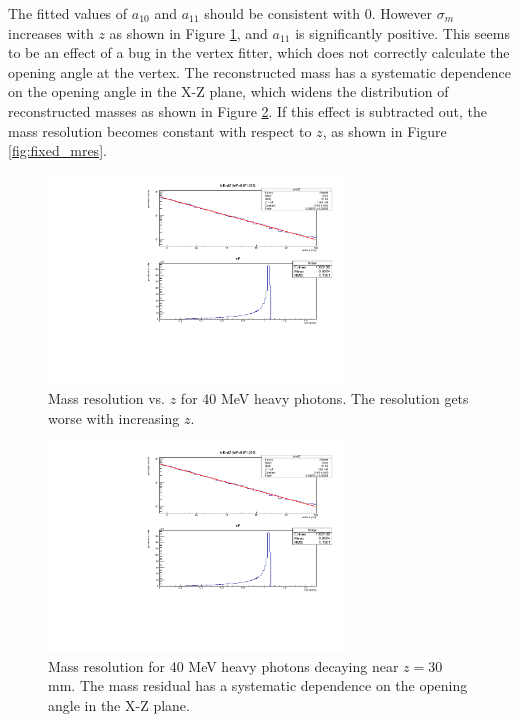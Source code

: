 The fitted values of $a_{10}$ and $a_{11}$ should be consistent with 0.
However $\sigma_m$ increases with $z$ as shown in Figure \ref{fig:skewed_mres}, and $a_{11}$ is significantly positive.
This seems to be an effect of a bug in the vertex fitter, which does not correctly calculate the opening angle at the vertex.
The reconstructed mass has a systematic dependence on the opening angle in the X-Z plane, which widens the distribution of reconstructed masses as shown in Figure \ref{fig:mass_skew}.
If this effect is subtracted out, the mass resolution becomes constant with respect to $z$, as shown in Figure \ref{fig:fixed_mres}.

\begin{figure}[ht]
\begin{center}
    \includegraphics[width=0.7\textwidth,page=4,angle=-90]{vertexing/figs/acceptance_40}
\end{center}
    \caption{Mass resolution vs. $z$ for 40 MeV heavy photons. The resolution gets worse with increasing $z$.}
    \label{fig:skewed_mres}
\end{figure}

\begin{figure}[ht]
\begin{center}
    \includegraphics[width=0.7\textwidth,page=5,angle=-90]{vertexing/figs/acceptance_40}
\end{center}
    \caption{Mass resolution for 40 MeV heavy photons decaying near $z=30$ mm. The mass residual has a systematic dependence on the opening angle in the X-Z plane.}
    \label{fig:mass_skew}
\end{figure}

